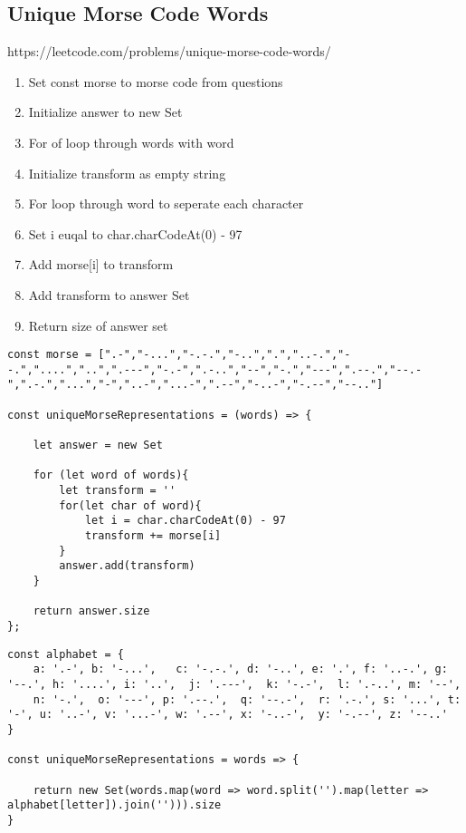 \documentclass[10pt]{article}
\begin{document}
\pagebreak %
\medskip 
\subsection{Unique Morse Code Words}
https://leetcode.com/problems/unique-morse-code-words/

\begin{enumerate}
	\item Set const morse to morse code from questions
	\item Initialize answer to new Set
	\item For of loop through words with word
	\item Initialize transform as empty string
	\item For loop through word to seperate each character
	\item Set i euqal to char.charCodeAt(0) - 97
	\item Add morse[i] to transform 
	\item Add transform to answer Set
	\item Return size of answer set
\end{enumerate}

\begin{lstlisting}[title=Solution uniqueMorseRepresentations, captionpos=t]
const morse = [".-","-...","-.-.","-..",".","..-.","--.","....","..",".---","-.-",".-..","--","-.","---",".--.","--.-",".-.","...","-","..-","...-",".--","-..-","-.--","--.."]

const uniqueMorseRepresentations = (words) => {
    
    let answer = new Set
    
    for (let word of words){
        let transform = ''
        for(let char of word){
            let i = char.charCodeAt(0) - 97
            transform += morse[i]
        }
        answer.add(transform)
    }
    
    return answer.size
};
\end{lstlisting}


\begin{lstlisting}[title=Solution uniqueMorseRepresentations with object, captionpos=t]
const alphabet = {
    a: '.-', b: '-...',   c: '-.-.', d: '-..', e: '.', f: '..-.', g: '--.', h: '....', i: '..',  j: '.---',  k: '-.-',  l: '.-..', m: '--',
    n: '-.',  o: '---', p: '.--.',  q: '--.-',  r: '.-.', s: '...', t: '-', u: '..-', v: '...-', w: '.--', x: '-..-',  y: '-.--', z: '--..' 
}

const uniqueMorseRepresentations = words => {  

    return new Set(words.map(word => word.split('').map(letter => alphabet[letter]).join(''))).size
}
\end{lstlisting}
\end{document}
